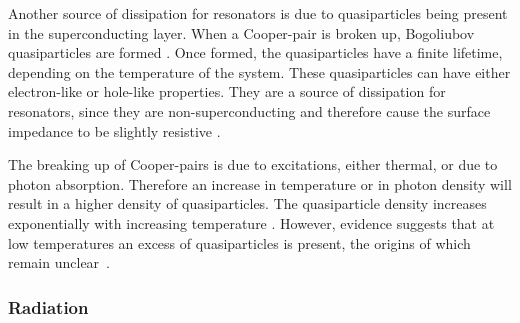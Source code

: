       Another source of dissipation for resonators is due to quasiparticles being present in the superconducting layer. When a Cooper-pair is broken up, Bogoliubov quasiparticles are formed \cite[p16]{Barends}. Once formed, the quasiparticles have a finite lifetime, depending on the temperature of the system. These quasiparticles can have either electron-like or hole-like properties. They are a source of dissipation for resonators, since they are non-superconducting and therefore cause the surface impedance to be slightly resistive \cite[p18]{Mazin}.

      The breaking up of Cooper-pairs is due to excitations, either thermal, or due to photon absorption. Therefore an increase in temperature or in photon density will result in a higher density of quasiparticles. The quasiparticle density increases exponentially with increasing temperature \cite[p44]{Mazin}. However, evidence suggests that at low temperatures an excess of quasiparticles is present, the origins of which remain unclear~\cite{de2011number}.





    \subsubsection{Radiation}

